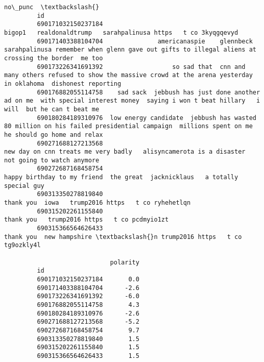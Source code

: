 \documentclass[11pt]{article}
\begin{document}
\begin{Verbatim}[commandchars=\\\{\}]
                                                                                                                                                                  no\_punc  \textbackslash{}
         id                                                                                                                                                                 
         690171032150237184                                                                             bigop1   realdonaldtrump   sarahpalinusa https   t co 3kyqgqevyd    
         690171403388104704               americanaspie    glennbeck  sarahpalinusa remember when glenn gave out gifts to illegal aliens at crossing the border  me too     
         690173226341691392                   so sad that  cnn and many others refused to show the massive crowd at the arena yesterday in oklahoma  dishonest reporting    
         690176882055114758    sad sack  jebbush has just done another ad on me  with special interest money  saying i won t beat hillary   i will  but he can t beat me    
         690180284189310976  low energy candidate  jebbush has wasted  80 million on his failed presidential campaign  millions spent on me  he should go home and relax    
         690271688127213568                                               new day on cnn treats me very badly   alisyncamerota is a disaster  not going to watch anymore    
         690272687168458754                                                                 happy birthday to my friend  the great  jacknicklaus   a totally special guy    
         690313350278819840                                                                                           thank you  iowa   trump2016 https   t co ryhehetlqn   
         690315202261155840                                                                                                 thank you   trump2016 https   t co pcdmyio1zt   
         690315366564626433                                                                                 thank you  new hampshire \textbackslash{}n trump2016 https   t co tg9ozkly4l   
         
                             polarity  
         id                            
         690171032150237184       0.0  
         690171403388104704      -2.6  
         690173226341691392      -6.0  
         690176882055114758       4.3  
         690180284189310976      -2.6  
         690271688127213568      -5.2  
         690272687168458754       9.7  
         690313350278819840       1.5  
         690315202261155840       1.5  
         690315366564626433       1.5  
\end{Verbatim}
            
\end{document}
